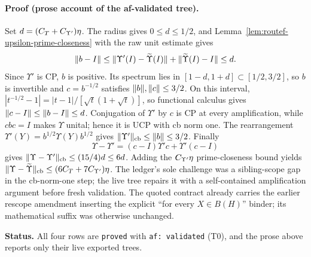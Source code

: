 \paragraph{Proof (prose account of the af-validated tree).}
Set $d=(C_T+C_{\Upsilon'})\eta$.  The radius gives $0\le d\le1/2$, and
Lemma~\ref{lem:routef-upsilon-prime-closeness} with the raw unit estimate gives
\[
 \lVert b-I\rVert\le\lVert \Upsilon'(I)-\widetilde\Upsilon(I)\rVert
 +\lVert \widetilde\Upsilon(I)-I\rVert\le d.
\]
Since $\Upsilon'$ is CP, $b$ is positive.  Its spectrum lies in
$[1-d,1+d]\subset[1/2,3/2]$, so $b$ is invertible and $c=b^{-1/2}$ satisfies
$\lVert b\rVert,\lVert c\rVert\le3/2$.  On this interval,
$|t^{-1/2}-1|=|t-1|/[\sqrt t(1+\sqrt t)]$, so functional calculus gives
$\lVert c-I\rVert\le\lVert b-I\rVert\le d$.  Conjugation of $\Upsilon'$ by $c$ is CP at every
amplification, while $cbc=I$ makes $\Upsilon$ unital; hence it is UCP with cb norm one.
The rearrangement $\Upsilon'(Y)=b^{1/2}\Upsilon(Y)b^{1/2}$ gives
$\lVert \Upsilon'\rVert_{\mathrm{cb}}\le\lVert b\rVert\le3/2$.  Finally
\[
 \Upsilon-\Upsilon'=(c-I)\Upsilon'c+\Upsilon'(c-I)
\]
gives $\lVert \Upsilon-\Upsilon'\rVert_{\mathrm{cb}}\le(15/4)d\le6d$.  Adding the
$C_{\Upsilon'}\eta$ prime-closeness bound yields
$\lVert \Upsilon-\widetilde\Upsilon\rVert_{\mathrm{cb}}\le(6C_T+7C_{\Upsilon'})\eta$.
The ledger's sole challenge was a sibling-scope gap in the cb-norm-one step; the live
tree repairs it with a self-contained amplification argument before fresh validation.
The quoted contract already carries the earlier rescope amendment inserting the explicit
``for every $X\in B(H)$'' binder; its mathematical suffix was otherwise unchanged.

\medskip
\noindent\textbf{Status.} All four rows are \texttt{proved} with
\texttt{af: validated} (T0), and the prose above reports only their live exported trees.
